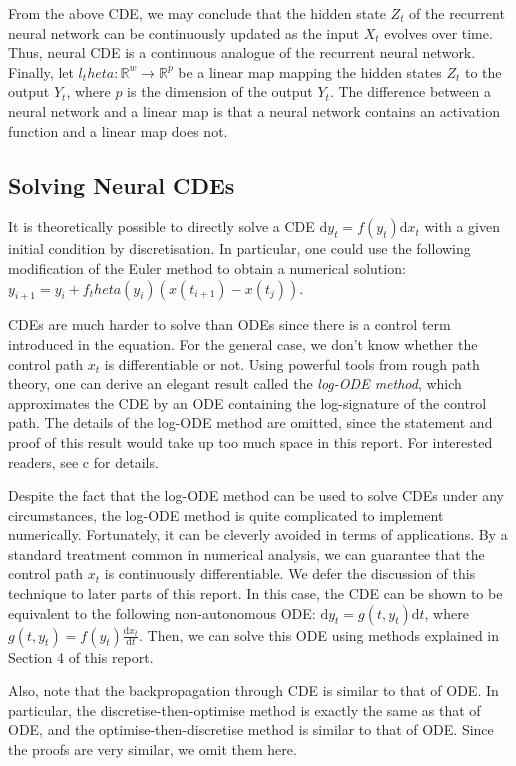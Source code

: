 \documentclass[a4paper,11pt,titlepage]{article}
\def\theta{theta}%
\theoremstyle{definition}
\theoremstyle{plain}
\theoremstyle{remark}
\begin{document}
From the above CDE, we may conclude that the hidden state $Z_t$ of the recurrent neural network can be continuously updated as the input $X_t$ evolves over time. Thus, neural CDE is a continuous analogue of the recurrent neural network. Finally, let $l_\theta:\mathbb{R}^w\rightarrow\mathbb{R}^p$ be a linear map mapping the hidden states $Z_t$ to the output $Y_t$, where $p$ is the dimension of the output $Y_t$. The difference between a neural network and a linear map is that a neural network contains an activation function and a linear map does not.

\subsection{Solving Neural CDEs}

It is theoretically possible to directly solve a CDE $\mathrm{d}y_t = f(y_t)\mathrm{d}x_t$ with a given initial condition by discretisation. In particular, one could use the following modification of the Euler method to obtain a numerical solution: $y_{i+1}=y_i+f_\theta(y_i)(x(t_{i+1})-x(t_j))$.

CDEs are much harder to solve than ODEs since there is a control term introduced in the equation. For the general case, we don't know whether the control path $x_t$ is differentiable or not. Using powerful tools from rough path theory, one can derive an elegant result called the \textit{log-ODE method}, which approximates the CDE by an ODE containing the log-signature of the control path. The details of the log-ODE method are omitted, since the statement and proof of this result would take up too much space in this report. For interested readers, see c for details.

Despite the fact that the log-ODE method can be used to solve CDEs under any circumstances, the log-ODE method is quite complicated to implement numerically. Fortunately, it can be cleverly avoided in terms of applications. By a standard treatment common in numerical analysis, we can guarantee that the control path $x_t$ is continuously differentiable. We defer the discussion of this technique to later parts of this report. In this case, the CDE can be shown to be equivalent to the following non-autonomous ODE: $\mathrm{d}y_t=g(t,y_t)\mathrm{d}t$, where $g(t,y_t)=f(y_t)\frac{\mathrm{d}x_t}{\mathrm{d}t}$. Then, we can solve this ODE using methods explained in Section 4 of this report.

Also, note that the backpropagation through CDE is similar to that of ODE. In particular, the discretise-then-optimise method is exactly the same as that of ODE, and the optimise-then-discretise method is similar to that of ODE. Since the proofs are very similar, we omit them here.
\end{document}

